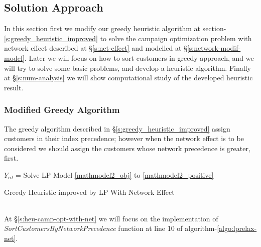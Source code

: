 \documentclass[11pt]{article}
\begin{document}
\subsection{Solution Approach}
In this section first we modify our greedy heuristic algorithm at section-\ref{s:greedy_heuristic_improved} to solve the campaign optimization problem with network effect described at \S \ref{s:net-effect} and modelled at \S \ref{s:network-modif-model}. Later we will focus on how to sort customers in greedy approach, and we will try to solve some basic problems, and develop a heuristic algorithm. Finally at \S \ref{s:num-analysis} we will show computational study of the developed heuristic  result.

\subsubsection{Modified Greedy Algorithm}
The greedy algorithm described in \S \ref{s:greedy_heuristic_improved} assign customers in their index precedence; however when the network effect is to be considered we should assign the customers whose network precedence is greater, first.
\\
\begin{algorithm}[H]
\DontPrintSemicolon
{}

  \;
$Y_{{c}{d}}$ = Solve LP Model \eqref{mathmodel2_obj} to \eqref{mathmodel2_positive}

\;
\caption{Greedy Heuristic improved by LP With Network Effect}
\label{algo:lprelax-net}
\end{algorithm}
\\
 At \S \ref{s:heu-camp-opt-with-net} we will focus on the implementation of \textit{SortCustomersByNetworkPrecedence} function at line 10 of algorithm-\ref{algo:lprelax-net}.\\
\end{document}
